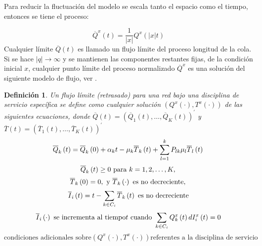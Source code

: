 \documentclass{article}
\newtheorem{Def}{Definición}
\begin{document}
Para reducir la fluctuaci\'on del modelo se escala tanto el
espacio como el tiempo, entonces se tiene el proceso:

\begin{equation}
\overline{Q}^{x}\left(t\right)=\frac{1}{|x|}Q^{x}\left(|x|t\right)
\end{equation}
Cualquier l\'imite $\overline{Q}\left(t\right)$ es llamado un
flujo l\'imite del proceso longitud de la cola. Si se hace
$|q|\rightarrow\infty$ y se mantienen las componentes restantes
fijas, de la condici\'on inicial $x$, cualquier punto l\'imite del
proceso normalizado $\overline{Q}^{x}$ es una soluci\'on del
siguiente modelo de flujo, ver \cite{Dai}.

\begin{Def}
Un flujo l\'imite (retrasado) para una red bajo una disciplina de
servicio espec\'ifica se define como cualquier soluci\'on
 $\left(Q^{x}\left(\cdot\right),T^{x}\left(\cdot\right)\right)$ de las siguientes ecuaciones, donde
$\overline{Q}\left(t\right)=\left(\overline{Q}_{1}\left(t\right),\ldots,\overline{Q}_{K}\left(t\right)\right)^{'}$
y
$\overline{T}\left(t\right)=\left(\overline{T}_{1}\left(t\right),\ldots,\overline{T}_{K}\left(t\right)\right)^{'}$
\begin{equation}\label{Eq.3.8}
\overline{Q}_{k}\left(t\right)=\overline{Q}_{k}\left(0\right)+\alpha_{k}t-\mu_{k}\overline{T}_{k}\left(t\right)+\sum_{l=1}^{k}P_{lk}\mu_{l}\overline{T}_{l}\left(t\right)\\
\end{equation}
\begin{equation}\label{Eq.3.9}
\overline{Q}_{k}\left(t\right)\geq0\textrm{ para }k=1,2,\ldots,K,\\
\end{equation}
\begin{equation}\label{Eq.3.10}
\overline{T}_{k}\left(0\right)=0,\textrm{ y }\overline{T}_{k}\left(\cdot\right)\textrm{ es no decreciente},\\
\end{equation}
\begin{equation}\label{Eq.3.11}
\overline{I}_{i}\left(t\right)=t-\sum_{k\in C_{i}}\overline{T}_{k}\left(t\right)\textrm{ es no decreciente}\\
\end{equation}
\begin{equation}\label{Eq.3.12}
\overline{I}_{i}\left(\cdot\right)\textrm{ se incrementa al tiempo}t\textrm{ cuando }\sum_{k\in C_{i}}Q_{k}^{x}\left(t\right)dI_{i}^{x}\left(t\right)=0\\
\end{equation}
\begin{equation}\label{Eq.3.13}
\textrm{condiciones adicionales sobre
}\left(Q^{x}\left(\cdot\right),T^{x}\left(\cdot\right)\right)\textrm{
referentes a la disciplina de servicio}
\end{equation}
\end{Def}
\end{document}
